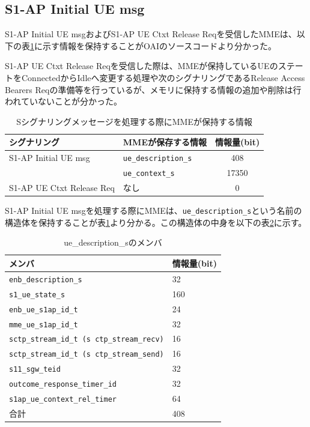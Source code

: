 \documentclass[a4j]{ujarticle}
\begin{document}
\clearpage
\subsection{S1-AP Initial UE msg}
S1-AP Initial UE msgおよびS1-AP UE Ctxt Release Reqを受信したMMEは、以下の表\ref{table:oai_source_memory}に示す情報を保持することがOAIのソースコードより分かった。

S1-AP UE Ctxt Release Reqを受信した際は、MMEが保持しているUEのステートをConnectedからIdleへ変更する処理や次のシグナリングであるRelease Access Bearers Reqの準備等を行っているが、メモリに保持する情報の追加や削除は行われていないことが分かった。
\begin{table}[htbp]
  \centering
  \caption{Sシグナリングメッセージを処理する際にMMEが保持する情報}
  \label{table:oai_source_memory}
  \begin{tabular}{l|l|c}
    \hline
    シグナリング  & MMEが保存する情報 & 情報量(bit)  \\ \hline \hline
    S1-AP Initial UE msg & \verb|ue_description_s| & 408 \\
    & \verb|ue_context_s| & 17350\\\hline
    S1-AP UE Ctxt Release Req & なし & 0 \\\hline
  \end{tabular}
\end{table}

S1-AP Initial UE msgを処理する際にMMEは、\verb|ue_description_s|という名前の構造体を保持することが表\ref{table:oai_source_memory}より分かる。この構造体の中身を以下の表\ref{table:oai_source_memory_ue_description_s}に示す。
\begin{table}[htbp]
  \centering
  \caption{ue\_description\_sのメンバ}
  \label{table:oai_source_memory_ue_description_s}
  \begin{tabular}{l|l}
    \hline
    メンバ & 情報量(bit) \\ \hline \hline
    \verb|enb_description_s| & 32\\
    \verb|s1_ue_state_s| & 160\\
    \verb|enb_ue_s1ap_id_t|  & 24\\
    \verb|mme_ue_s1ap_id_t| & 32\\
    \verb|sctp_stream_id_t (s ctp_stream_recv)| & 16\\
    \verb|sctp_stream_id_t (s ctp_stream_send)| & 16\\
    \verb|s11_sgw_teid| & 32\\
    \verb|outcome_response_timer_id| & 32\\
    \verb|s1ap_ue_context_rel_timer| & 64\\\hline
    合計  & 408\\\hline
  \end{tabular}
\end{table}
\end{document}
